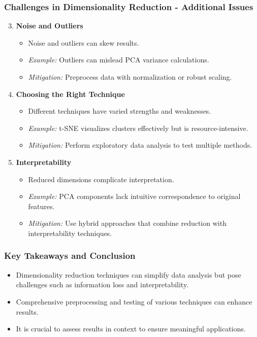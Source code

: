 \documentclass[aspectratio=169]{beamer}
\begin{document}
\begin{frame}[fragile]
    \frametitle{Challenges in Dimensionality Reduction - Additional Issues}
    \begin{enumerate}
        \setcounter{enumi}{2} %
        \item \textbf{Noise and Outliers}
            \begin{itemize}
                \item Noise and outliers can skew results.
                \item \textit{Example:} Outliers can mislead PCA variance calculations.
                \item \textit{Mitigation:} Preprocess data with normalization or robust scaling.
            \end{itemize}

        \item \textbf{Choosing the Right Technique}
            \begin{itemize}
                \item Different techniques have varied strengths and weaknesses.
                \item \textit{Example:} t-SNE visualizes clusters effectively but is resource-intensive.
                \item \textit{Mitigation:} Perform exploratory data analysis to test multiple methods.
            \end{itemize}

        \item \textbf{Interpretability}
            \begin{itemize}
                \item Reduced dimensions complicate interpretation.
                \item \textit{Example:} PCA components lack intuitive correspondence to original features.
                \item \textit{Mitigation:} Use hybrid approaches that combine reduction with interpretability techniques.
            \end{itemize}
    \end{enumerate}
\end{frame}

\begin{frame}[fragile]
    \frametitle{Key Takeaways and Conclusion}
    \begin{itemize}
        \item Dimensionality reduction techniques can simplify data analysis but pose challenges such as information loss and interpretability.
        \item Comprehensive preprocessing and testing of various techniques can enhance results.
        \item It is crucial to assess results in context to ensure meaningful applications.
    \end{itemize}
\end{frame}
\end{document}

